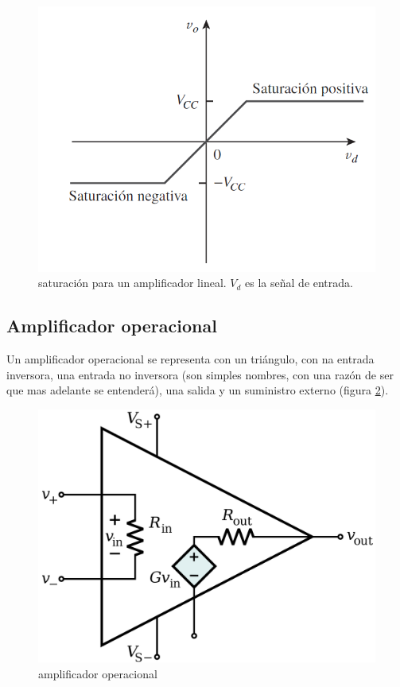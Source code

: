 \documentclass[12pt,a4paper]{article}
\numberwithin{equation}{section}
\numberwithin{figure}{section}
\begin{document}
\begin{figure}[h!] \centering
\includegraphics[scale=0.5]{0.Saturacion}
\caption{saturación para un amplificador lineal. $V_d$ es la señal de entrada.}
\label{Fig:1.1-Saturacion}
\end{figure}




\subsection{Amplificador operacional}

Un amplificador operacional se representa con un triángulo, con na entrada inversora, una entrada no inversora (son simples nombres, con una razón de ser que mas adelante se entenderá), una salida y un suministro externo (figura \ref{Fig:1.2-Amplificador}). \\


\begin{figure}[h!] \centering
\includegraphics[scale=0.10]{1.2-Amplificador.png}
\caption{amplificador operacional}
\label{Fig:1.2-Amplificador}
\end{figure}
\end{document}
